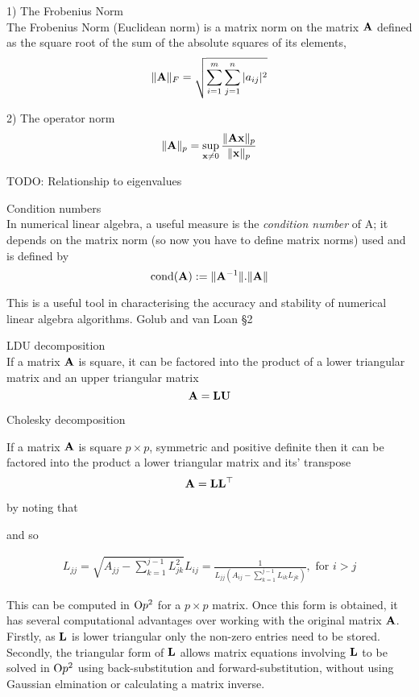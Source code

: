 \documentclass{amsart}[12pt]
\begin{document}
1) The Frobenius Norm \\
The Frobenius Norm (Euclidean norm) is a matrix norm on the matrix ${\bf A}$ defined as the square root of the sum
of the absolute squares of its elements,
\[
	\|{\bf A}\|_F = \sqrt{\sum_{i=1}^m \sum_{j=1}^n |a_{ij}|^2}
\]

2) The operator norm
\[
	\|{\bf A}\|_p = \sup_{{\bf x} \ne 0} \frac{\|{\bf A} {\bf x}\|_p}{\|{\bf x}\|_p}
\]

TODO: Relationship to eigenvalues

Condition numbers \\
In numerical linear algebra, a useful measure is the \emph{condition number} of A; it depends on the matrix
norm (so now you have to define matrix norms) used and is defined by
\[
	\text{cond}({\bf A}) := \|{\bf A}^{-1}\|.\|{\bf A}\|
\]

This is a useful tool in characterising the accuracy and stability of numerical linear algebra algorithms.
Golub and van Loan \S 2

LDU decomposition \\

If a matrix ${\bf A}$ is square, it can be factored into the product of a lower triangular matrix and an upper 
triangular matrix
\[
	{\bf A} = {\bf L} {\bf U}
\]

Cholesky decomposition

If a matrix ${\bf A}$ is square $p \times p$, symmetric and positive definite then it can be factored into the
product a lower triangular matrix and its' transpose
\[
	{\bf A} = {\bf L} {\bf L}^\top
\]

by noting that


and so

\begin{align*}
	L_{jj} = \sqrt{A_{jj} - \sum_{k=1}^{j-1} L_{jk}^2}
	L_{ij} = \frac{1}{L_{jj} (A_{ij} - \sum_{k=1}^{j-1} L_{ik} L_{jk})}, \text{ for } i > j
\end{align*}

This can be computed in $\text{O}{p^2}$ for a $p \times p$ matrix. Once this form is obtained, it has several
computational advantages over working with the original matrix ${\bf A}$. Firstly, as ${\bf L}$ is lower triangular
only the non-zero entries need to be stored. Secondly, the triangular form of ${\bf L}$ allows matrix equations
involving ${\bf L}$ to be solved in $\text{O}{p^2}$ using back-substitution and forward-substitution, without using
Gaussian elmination or calculating a matrix inverse.
\end{document}

